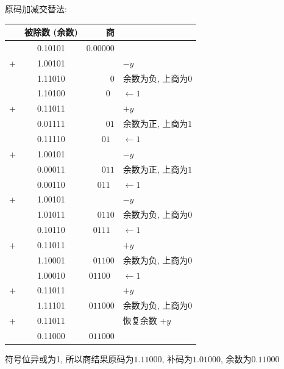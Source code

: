 \documentclass[UTF8]{report}
\newcommand{\la}{\leftarrow}
\newcommand{\spz}{\phantom{0}}
\newenvironment{solution}{{\noindent\hskip 2em \bf 解 \quad}}{}
\begin{document}
\begin{solution}
\begin{enumerate}
        原码加减交替法:
        \begin{tabular}{cc|r|l}
            & 被除数 (余数)   & 商    & \\
           \hline
            & 0.10101  &  $0.00000 $ &   \\
           +& 1.00101  &         $ $ &  $-y$ \\
           \hline
            & 1.11010  &        $0 $ & 余数为负, 上商为$0$ \\
            & 1.10100  &     $0\spz$ & $\la 1$ \\
           +& 0.11011  &         $ $ &  $+y$ \\
           \hline
            & 0.01111  &       $01 $ & 余数为正, 上商为$1$ \\
            & 0.11110  &    $01\spz$ & $\la 1$ \\
           +& 1.00101  &         $ $ &  $-y$ \\
           \hline
            & 0.00011  &      $011 $ & 余数为正, 上商为$1$ \\
            & 0.00110  &   $011\spz$ & $\la 1$ \\
           +& 1.00101  &         $ $ &  $-y$ \\
           \hline
            & 1.01011  &     $0110 $ & 余数为负, 上商为$0$ \\
            & 0.10110  &  $0111\spz$ & $\la 1$ \\
           +& 0.11011  &         $ $ &  $+y$ \\
           \hline
            & 1.10001  &    $01100 $ & 余数为负, 上商为$0$ \\
            & 1.00010  & $01100\spz$ & $\la 1$ \\
           +& 0.11011  &         $ $ &  $+y$ \\
           \hline
            & 1.11101  &   $011000 $ & 余数为负, 上商为$0$ \\
           +& 0.11011  &         $ $ & 恢复余数 $+y$ \\
           \hline
            & 0.11000  &   $011000 $ &  \\
        \end{tabular}

        符号位异或为1, 所以商结果原码为$1.11000$, 补码为$1.01000$, 余数为$0.11000$


\end{enumerate}
\end{solution}
\end{document}
